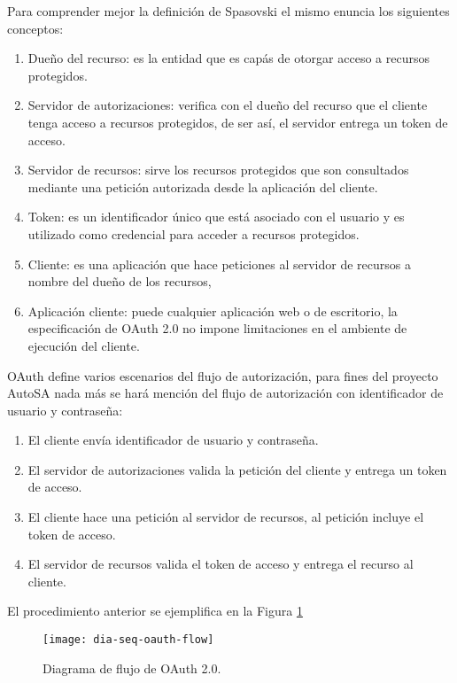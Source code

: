 Para comprender mejor la definición de Spasovski el mismo enuncia los siguientes conceptos\cite{OAuth2Identity}:
\begin{enumerate}
	\item Dueño del recurso: es la entidad que es capás de otorgar acceso a recursos protegidos.
	\item Servidor de autorizaciones: verifica con el dueño del recurso que el cliente tenga acceso a recursos protegidos, de ser así, el servidor entrega un token de acceso.
	\item Servidor de recursos: sirve los recursos protegidos que son consultados mediante una petición autorizada desde la aplicación del cliente.
	\item Token: es un identificador único que está asociado con el usuario y es utilizado como credencial para acceder a recursos protegidos.
	\item Cliente: es una aplicación que hace peticiones al servidor de recursos a nombre del dueño de los recursos, 
	\item Aplicación cliente: puede cualquier aplicación web o de escritorio, la especificación de OAuth 2.0 no impone limitaciones en el ambiente de ejecución del cliente.
\end{enumerate}

OAuth define varios escenarios del flujo de autorización, para fines del proyecto AutoSA nada más se hará mención del flujo de autorización con identificador de usuario y contraseña\cite{OAuth2Identity}:
\begin{enumerate}
	\item El cliente envía identificador de usuario y contraseña.
	\item El servidor de autorizaciones valida la petición del cliente y entrega un token de acceso.
	\item El cliente hace una petición al servidor de recursos, al petición incluye el token de acceso.
	\item El servidor de recursos valida el token de acceso y entrega el recurso al cliente.
\end{enumerate}
El procedimiento anterior se ejemplifica en la Figura \ref{fig:dia-seq-oauth-flow}
\begin{figure}[h]
	\centering
	\texttt{[image: dia-seq-oauth-flow]}
	\caption{Diagrama de flujo de OAuth 2.0.}
	\label{fig:dia-seq-oauth-flow}
\end{figure}

